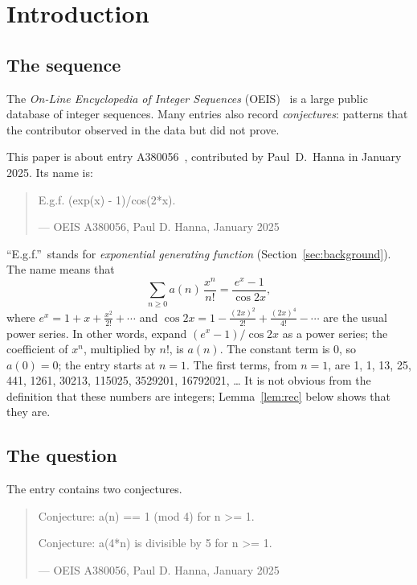 \documentclass[11pt,a4paper]{article}
\theoremstyle{definition}
\theoremstyle{remark}
\begin{document}
\section{Introduction}

\subsection{The sequence}\label{sec:sequence}
The \emph{On-Line Encyclopedia of Integer Sequences} (OEIS)~\cite{oeisdb} is a large public database of integer
sequences. Many
entries also record \emph{conjectures}: patterns that the contributor observed in the data but did not prove.

This paper is about entry A380056~\cite{oeis}, contributed by Paul~D.~Hanna in January 2025. Its name is:
\begin{quote}\small\ttfamily\raggedright E.g.f. (exp(x) - 1)/cos(2*x).\par\smallskip\hfill\textrm{--- OEIS A380056, Paul D. Hanna, January 2025}\end{quote}

``E.g.f.''\ stands for \emph{exponential generating function} (Section~\ref{sec:background}). The name means that
\begin{equation}\label{eq:def}
\sum_{n\ge0}a(n)\,\frac{x^n}{n!}=\frac{e^x-1}{\cos 2x},
\end{equation}
where $e^x=1+x+\frac{x^2}{2!}+\cdots$ and $\cos2x=1-\frac{(2x)^2}{2!}+\frac{(2x)^4}{4!}-\cdots$ are the usual power series.
In other words, expand $(e^x-1)/\cos2x$ as a power series; the coefficient of $x^n$, multiplied by $n!$, is $a(n)$. The
constant term is $0$, so $a(0)=0$; the entry starts at $n=1$. The first terms, from $n=1$, are
1, 1, 13, 25, 441, 1261, 30213, 115025, 3529201, 16792021, \dots{} It is not obvious from the definition that these numbers are
integers; Lemma~\ref{lem:rec} below shows that they are.

\subsection{The question}
The entry contains two conjectures.
\begin{quote}\small\ttfamily\raggedright Conjecture: a(n) == 1 (mod 4) for n >= 1.\par\smallskip Conjecture: a(4*n) is divisible by 5 for n >= 1.\par\smallskip\hfill\textrm{--- OEIS A380056, Paul D. Hanna, January 2025}\end{quote}
\end{document}
